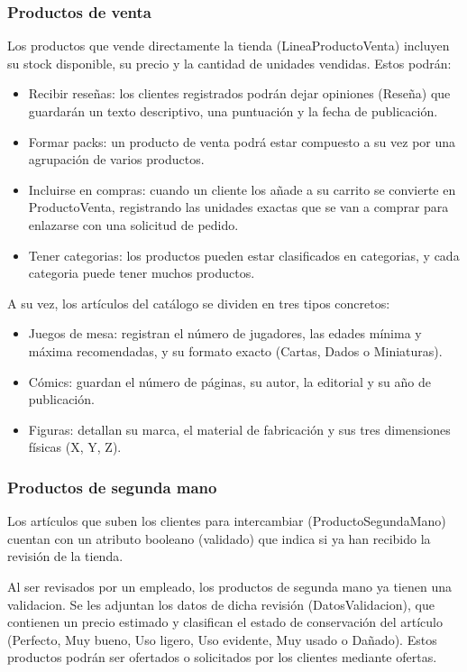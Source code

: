 \documentclass{article}
\begin{document}
\subsubsection{Productos de venta}
Los productos que vende directamente la tienda (LineaProductoVenta) incluyen su stock disponible, su precio y la cantidad de unidades vendidas. Estos podrán:
\begin{itemize}
  \item Recibir reseñas: los clientes registrados podrán dejar opiniones (Reseña) que guardarán un texto descriptivo, una puntuación y la fecha de publicación.
  \item Formar packs: un producto de venta podrá estar compuesto a su vez por una agrupación de varios productos.
  \item Incluirse en compras: cuando un cliente los añade a su carrito se convierte en ProductoVenta, registrando las unidades exactas que se van a comprar para enlazarse con una solicitud de pedido.
  \item Tener categorias: los productos pueden estar clasificados en categorias, y cada categoria puede tener muchos productos.
\end{itemize}

A su vez, los artículos del catálogo se dividen en tres tipos concretos:
\begin{itemize}
  \item Juegos de mesa: registran el número de jugadores, las edades mínima y máxima recomendadas, y su formato exacto (Cartas, Dados o Miniaturas).
  \item Cómics: guardan el número de páginas, su autor, la editorial y su año de publicación.
  \item Figuras: detallan su marca, el material de fabricación y sus tres dimensiones físicas (X, Y, Z).
\end{itemize}

  \subsubsection{Productos de segunda mano}
Los artículos que suben los clientes para intercambiar (ProductoSegundaMano) cuentan con un atributo booleano (validado) que indica si ya han recibido la revisión de la tienda. 

Al ser revisados por un empleado, los productos de segunda mano ya tienen una validacion. Se les adjuntan los datos de dicha revisión (DatosValidacion), que contienen un precio estimado y 
clasifican el estado de conservación del artículo (Perfecto, Muy bueno, Uso ligero, Uso evidente, Muy usado o Dañado).
Estos productos podrán ser ofertados o solicitados por los clientes mediante ofertas.
\end{document}
